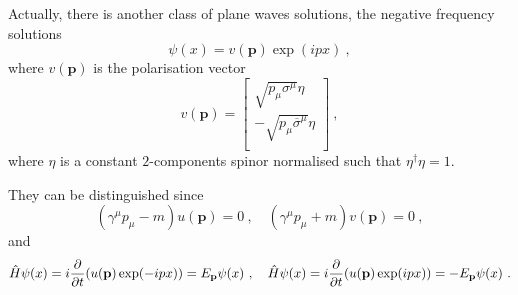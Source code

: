     Actually, there is another class of plane waves solutions, the negative frequency solutions 
    \begin{equation*}
        \psi(x) = v(\mathbf p) \exp(i p x) ~,
    \end{equation*}
    where $v (\mathbf p)$ is the polarisation vector 
    \begin{equation*}
        v (\mathbf p) = \begin{bmatrix}
            \sqrt{p_\mu \sigma^\mu} \eta \\
            - \sqrt{p_\mu \overline \sigma^\mu} \eta \\
        \end{bmatrix} ~,
    \end{equation*}
    where $\eta$ is a constant $2$-components spinor normalised such that $\eta^\dagger \eta = 1$. 

    They can be distinguished since 
    \begin{equation*}
        (\gamma^\mu p_\mu - m) u(\mathbf p) = 0 ~, \quad (\gamma^\mu p_\mu + m) v(\mathbf p) = 0 ~,
    \end{equation*}
    and 
    \begin{equation*}
        \hat H \psi(x) = i \frac{\partial}{\partial t} (u (\mathbf p) \exp(- i px)) = E_{\mathbf p} \psi (x) ~, \quad \hat H \psi(x) = i \frac{\partial}{\partial t} (u (\mathbf p) \exp(i px)) = - E_{\mathbf p} \psi (x) ~.
    \end{equation*}

